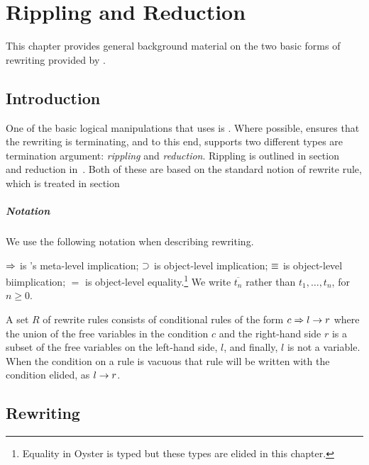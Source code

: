 \def\rcsid{$Id: general.tex,v 1.15 1999/04/30 14:42:32 img Exp $}


\chapter {Rippling and Reduction}
\label {ch:gen}

This chapter provides general background material on the two basic
forms of rewriting provided by \clam.  




\section {Introduction}
One of the basic logical manipulations that \clam{} uses is .  Where possible, \clam{} ensures that the rewriting is
terminating, and to this end, \clam supports two
different types are termination argument: {\em rippling\/} and {\em
reduction}.   Rippling is outlined in
section~ and reduction
in~.  Both of these are based on the standard 
notion of rewrite rule, which is treated in section~

\paragraph {Notation}

We use the following notation when describing rewriting.

$\Rightarrow$ is \clam's meta-level implication; $\supset$ is
object-level implication; $\equiv$ is object-level biimplication; $=$
is object-level equality.\footnote {Equality in Oyster is typed but
these types are elided in this chapter.}  We write $\overline{t_n}$
rather than $t_1,\ldots,t_n$, for $n\geq 0$.

A set $R$ of rewrite rules consists of conditional rules of the form
$c\Rightarrow l\rightarrow r$ where the
union of the free variables in the condition $c$ and the right-hand
side $r$ is a subset of the free variables on the left-hand side,
$l$, and finally, $l$ is not a variable.  When the condition on a rule
is vacuous that rule will be written with the condition elided, as
$l\rightarrow r$.


\section {Rewriting}
\label{sec:rewriting}

